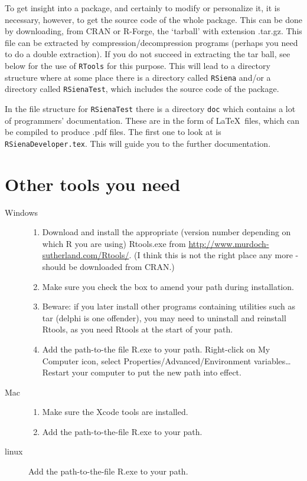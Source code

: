 \documentclass[a4paper,fleqn,11pt]{article}
\newcommand{\+}{\, + \,}
\newcommand{\sfn}[1]{\textsf{#1}}
\newcommand{\R}{{\sf R }}
\begin{document}
{To get insight into a package, and certainly to modify
or personalize it, it is necessary, however,
to get the source code of the whole package.
This can be done by downloading, from CRAN or R-Forge,
the `tarball' with extension \sfn{.tar.gz}.
This file can be extracted by compression/decompression
programs (perhaps you need to do a double extraction).
If you do not succeed in extracting the tar ball, see below
for the use of \texttt{RTools} for this purpose.
This will lead to a directory structure where at some place
there is a directory called \texttt{RSiena} and/or a directory
called \texttt{RSienaTest}, which includes the source code
of the package.

In the file structure for \texttt{RSienaTest} there is a directory
\texttt{doc} which contains a lot of programmers' documentation.
These are in the form of \LaTeX \ files, which can be compiled
to produce .pdf files.
The first one to look at is \texttt{RSienaDeveloper.tex}.
This will guide you to the further documentation.

\section{Other tools you need}
\begin{description}
\item[Windows]
\begin{enumerate}
\item Download and install the appropriate (version number
  depending on which \R you are using)
\textsf{Rtools.exe} from
  \url{http://www.murdoch-sutherland.com/Rtools/}.
  (I think this is not the right place any more - should be downloaded from CRAN.)
\item Make sure you check the box to amend your path during installation.
\item Beware: if you later install
  other programs containing utilities such as tar (delphi is one offender),
  you may need to uninstall and reinstall Rtools, as you need Rtools
  at the start of your path.
\item Add the path-to-the file
 R.exe to your path. Right-click on My Computer icon,
  select Properties/Advanced/Environment variables\ldots   \\
 Restart your computer to put the new path into effect.
\end{enumerate}
\item[Mac]
\begin{enumerate}
\item Make sure the Xcode tools are installed.
\item Add the path-to-the-file R.exe to your path.
\end{enumerate}
\item[linux]
 Add the path-to-the-file R.exe to your path.
\end{description}

}
\end{document}
